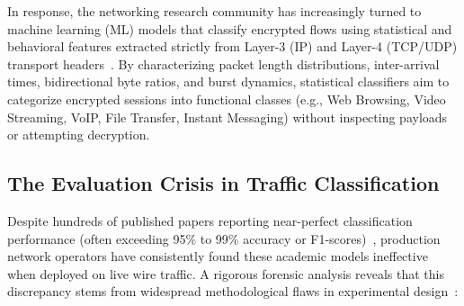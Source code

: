 \documentclass[conference]{IEEEtran}
\begin{document}
In response, the networking research community has increasingly turned to machine learning (ML) models that classify encrypted flows using statistical and behavioral features extracted strictly from Layer-3 (IP) and Layer-4 (TCP/UDP) transport headers~\cite{paxson1994empirically,moore2005internet,crotti2007traffic,taylor2016appscanner}. By characterizing packet length distributions, inter-arrival times, bidirectional byte ratios, and burst dynamics, statistical classifiers aim to categorize encrypted sessions into functional classes (e.g., Web Browsing, Video Streaming, VoIP, File Transfer, Instant Messaging) without inspecting payloads or attempting decryption.

\subsection{The Evaluation Crisis in Traffic Classification}
Despite hundreds of published papers reporting near-perfect classification performance (often exceeding 95\% to 99\% accuracy or F1-scores)~\cite{lotfollahi2020deep,wang2017end,lin2022etbert}, production network operators have consistently found these academic models ineffective when deployed on live wire traffic. A rigorous forensic analysis reveals that this discrepancy stems from widespread methodological flaws in experimental design~\cite{arp2022dos,pendlebury2019tesseract,sommer2010outside}:
\end{document}
